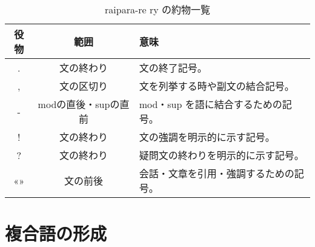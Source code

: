 \begin{table}[H]
    \centering
    \caption{raipara-re ry の約物一覧}
    \label{table:list-of-punctuation}
    \begin{tabular}{ccl}
        \toprule
        役物 & 範囲 & 意味 \\
        \midrule
        .  & 文の終わり & 文の終了記号。 \\
        ,  & 文の区切り & 文を列挙する時や副文の結合記号。 \\
        -  & modの直後・supの直前 & mod・sup を語に結合するための記号。 \\
        !  & 文の終わり & 文の強調を明示的に示す記号。 \\
        ?  & 文の終わり & 疑問文の終わりを明示的に示す記号。 \\
        «» & 文の前後 & 会話・文章を引用・強調するための記号。 \\
        \bottomrule
    \end{tabular}
\end{table}

\section{複合語の形成}